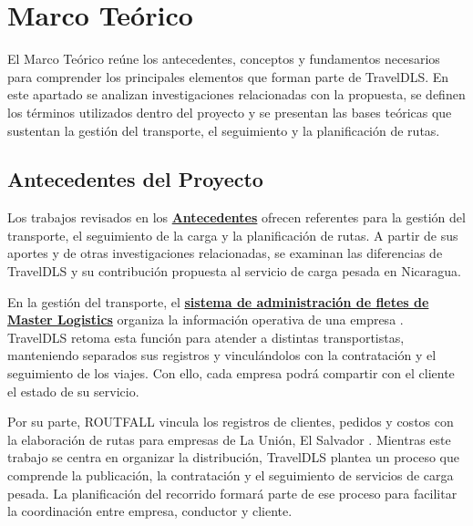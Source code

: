 
\section{Marco Teórico}
\label{sec:marco-teorico}

El Marco Teórico reúne los antecedentes, conceptos y fundamentos necesarios para comprender los principales elementos que forman parte de TravelDLS. En este apartado se analizan investigaciones relacionadas con la propuesta, se definen los términos utilizados dentro del proyecto y se presentan las bases teóricas que sustentan la gestión del transporte, el seguimiento y la planificación de rutas.

\subsection{Antecedentes del Proyecto}
\label{sec:antecedentes-proyecto}

Los trabajos revisados en los \textbf{\hyperref[sec:antecedentes]{Antecedentes}} ofrecen referentes para la gestión del transporte, el seguimiento de la carga y la planificación de rutas. A partir de sus aportes y de otras investigaciones relacionadas, se examinan las diferencias de TravelDLS y su contribución propuesta al servicio de carga pesada en Nicaragua.

En la gestión del transporte, el \textbf{\hyperref[ant:aragon]{sistema de administración de fletes de Master Logistics}} organiza la información operativa de una empresa \parencite[pp.~2, 9]{aragon2018implementacion}. TravelDLS retoma esta función para atender a distintas transportistas, manteniendo separados sus registros y vinculándolos con la contratación y el seguimiento de los viajes. Con ello, cada empresa podrá compartir con el cliente el estado de su servicio.

Por su parte, ROUTFALL vincula los registros de clientes, pedidos y costos con la elaboración de rutas para empresas de La Unión, El Salvador \parencite[pp.~52--53, 59--60]{flores2017rutas}. Mientras este trabajo se centra en organizar la distribución, TravelDLS plantea un proceso que comprende la publicación, la contratación y el seguimiento de servicios de carga pesada. La planificación del recorrido formará parte de ese proceso para facilitar la coordinación entre empresa, conductor y cliente.

